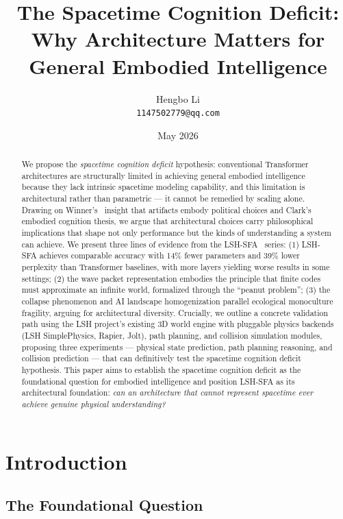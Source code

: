\documentclass{article}
\title{The Spacetime Cognition Deficit: Why Architecture Matters for General Embodied Intelligence}
\author{Hengbo Li\\
\texttt{1147502779@qq.com}
}
\date{May 2026}
\begin{document}
\maketitle

\begin{abstract}
We propose the \textit{spacetime cognition deficit} hypothesis: conventional Transformer architectures are structurally limited in achieving general embodied intelligence because they lack intrinsic spacetime modeling capability, and this limitation is architectural rather than parametric --- it cannot be remedied by scaling alone. Drawing on Winner's~\citep{winner1980} insight that artifacts embody political choices and Clark's~\citep{clark1997} embodied cognition thesis, we argue that architectural choices carry philosophical implications that shape not only performance but the kinds of understanding a system can achieve. We present three lines of evidence from the LSH-SFA~\citep{lsh-sfa} series: (1) LSH-SFA achieves comparable accuracy with 14\% fewer parameters and 39\% lower perplexity than Transformer baselines, with more layers yielding worse results in some settings; (2) the wave packet representation embodies the principle that finite codes must approximate an infinite world, formalized through the ``peanut problem''; (3) the collapse phenomenon and AI landscape homogenization parallel ecological monoculture fragility, arguing for architectural diversity. Crucially, we outline a concrete validation path using the LSH project's existing 3D world engine with pluggable physics backends (LSH SimplePhysics, Rapier, Jolt), path planning, and collision simulation modules, proposing three experiments --- physical state prediction, path planning reasoning, and collision prediction --- that can definitively test the spacetime cognition deficit hypothesis. This paper aims to establish the spacetime cognition deficit as the foundational question for embodied intelligence and position LSH-SFA as its architectural foundation: \textit{can an architecture that cannot represent spacetime ever achieve genuine physical understanding?}
\end{abstract}

\section{Introduction}

\subsection{The Foundational Question}
\end{document}
